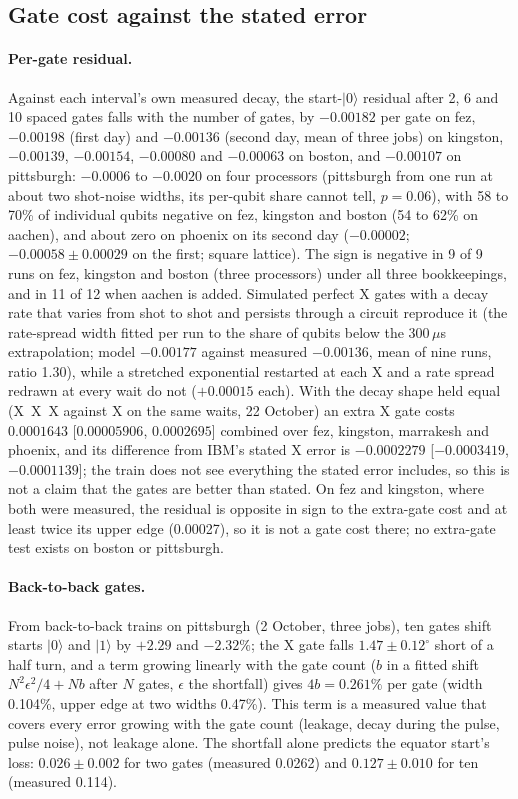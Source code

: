 \documentclass[reprint,amsmath,amssymb,aps,superscriptaddress,nofootinbib]{revtex4-2}
\newcommand{\us}{\,$\mu$s}
\begin{document}
\subsection{Gate cost against the stated error}\label{sec:gate}

\paragraph*{Per-gate residual.} Against each interval's own measured decay, the start-$|0\rangle$ residual after 2, 6 and 10 spaced gates falls with the number of gates, by $-0.00182$ per gate on fez, $-0.00198$ (first day) and $-0.00136$ (second day, mean of three jobs) on kingston, $-0.00139$, $-0.00154$, $-0.00080$ and $-0.00063$ on boston, and $-0.00107$ on pittsburgh: $-0.0006$ to $-0.0020$ on four processors (pittsburgh from one run at about two shot-noise widths, its per-qubit share cannot tell, $p=0.06$), with 58 to 70\% of individual qubits negative on fez, kingston and boston (54 to 62\% on aachen), and about zero on phoenix on its second day ($-0.00002$; $-0.00058\pm0.00029$ on the first; square lattice). The sign is negative in 9 of 9 runs on fez, kingston and boston (three processors) under all three bookkeepings, and in 11 of 12 when aachen is added. Simulated perfect X gates with a decay rate that varies from shot to shot and persists through a circuit reproduce it (the rate-spread width fitted per run to the share of qubits below the 300\us{} extrapolation; model $-0.00177$ against measured $-0.00136$, mean of nine runs, ratio 1.30), while a stretched exponential restarted at each X and a rate spread redrawn at every wait do not ($+0.00015$ each). With the decay shape held equal (X~X~X against X on the same waits, 22 October) an extra X gate costs $0.0001643$ [$0.00005906$, $0.0002695$] combined over fez, kingston, marrakesh and phoenix, and its difference from IBM's stated X error is $-0.0002279$ [$-0.0003419$, $-0.0001139$]; the train does not see everything the stated error includes, so this is not a claim that the gates are better than stated. On fez and kingston, where both were measured, the residual is opposite in sign to the extra-gate cost and at least twice its upper edge (0.00027), so it is not a gate cost there; no extra-gate test exists on boston or pittsburgh.

\paragraph*{Back-to-back gates.} From back-to-back trains on pittsburgh (2 October, three jobs), ten gates shift starts $|0\rangle$ and $|1\rangle$ by $+2.29$ and $-2.32\%$; the X gate falls $1.47\pm0.12^\circ$ short of a half turn, and a term growing linearly with the gate count ($b$ in a fitted shift $N^2\epsilon^2/4+Nb$ after $N$ gates, $\epsilon$ the shortfall) gives $4b=0.261\%$ per gate (width 0.104\%, upper edge at two widths 0.47\%). This term is a measured value that covers every error growing with the gate count (leakage, decay during the pulse, pulse noise), not leakage alone. The shortfall alone predicts the equator start's loss: $0.026\pm0.002$ for two gates (measured 0.0262) and $0.127\pm0.010$ for ten (measured 0.114).
\end{document}
